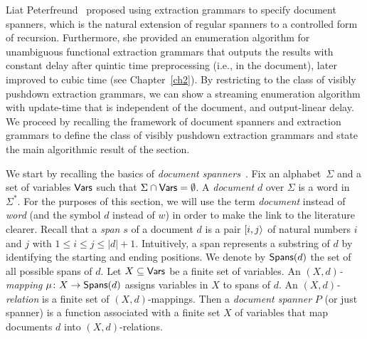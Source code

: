 
Liat Peterfreund~\cite{liatpaper} proposed using extraction grammars to specify document spanners, which is the natural extension of regular spanners to a controlled form of recursion. Furthermore, she provided an enumeration algorithm for unambiguous functional extraction grammars that outputs the results with constant delay after quintic time preprocessing (i.e., in the document), later improved to cubic time (see Chapter~\ref{ch2}). By restricting to the class of visibly pushdown extraction grammars, we can show a streaming enumeration algorithm with update-time that is independent of the document, and output-linear delay. We proceed by recalling the framework of document spanners and extraction grammars to define the class of visibly pushdown extraction grammars and state the main algorithmic result of the section. 

We start by recalling the basics of \emph{document spanners}~\cite{FaginKRV15}. Fix an alphabet~$\Sigma$ and a set of variables $\mathsf{Vars}$ such that $\Sigma \cap \mathsf{Vars} = \emptyset$. A \emph{document} $d$ over $\Sigma$ is a word in $\Sigma^*$. For the purposes of this section, we will use the term {\it document} instead of {\it word} (and the symbol $d$ instead of $w$) in order to make the link to the literature clearer. Recall that a \emph{span} $s$ of a document $d$ is a pair $[i,j\rangle$ of natural numbers $i$ and $j$ with $1 \leq i \leq j \leq |d|+1$. Intuitively, a span represents a substring of $d$ by identifying the starting and ending positions. 
We denote by $\mathsf{Spans}(d)$ the set of all possible spans of $d$.
Let $X \subseteq \mathsf{Vars}$ be a finite set of variables.
An \emph{$(X, d)$-mapping} $\mu\colon X \rightarrow \mathsf{Spans}(d)$ assigns variables in $X$ to spans of $d$. An \emph{$(X, d)$-relation} is a finite set of $(X, d)$-mappings. Then a \emph{document spanner} $P$ (or just spanner) is a function associated with a finite set $X$ of variables that map documents $d$ into $(X, d)$-relations.  

